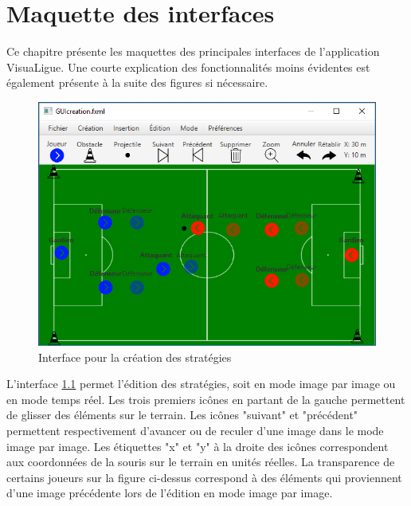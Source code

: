 
\chapter{Maquette des interfaces}
\label{s:maquettes_interfaces}

Ce chapitre présente les maquettes des principales interfaces de l'application VisuaLigue.
Une courte explication des fonctionnalités moins évidentes est également présente à la suite des figures si nécessaire.

\begin{figure}[htpb]
    \centering
    \includegraphics[scale=0.6]{fig/gui/gui_creation.png}
    \caption{Interface pour la création des stratégies}
    \label{fig:gui:gui_creation}
\end{figure}

L'interface \ref{fig:gui:gui_creation} permet l'édition des stratégies, soit en mode image par image ou en mode temps réel.
Les trois premiers icônes en partant de la gauche permettent de glisser des éléments sur le terrain.
Les icônes "suivant" et "précédent" permettent respectivement d'avancer ou de reculer d'une image dans le mode image par image.
Les étiquettes "x" et "y" à la droite des icônes correspondent aux coordonnées de la souris sur le terrain en unités réelles.
La transparence de certains joueurs sur la figure ci-dessus correspond à des éléments qui proviennent d'une image précédente lors de l'édition en mode image par image.

